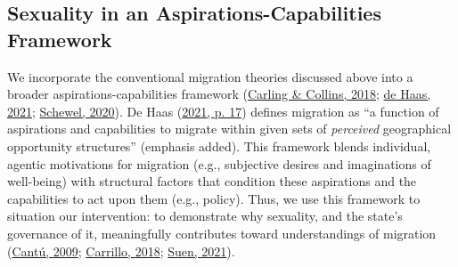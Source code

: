 \documentclass[
  12pt,
]{article}
\begin{document}
\hypertarget{sexuality-in-an-aspirations-capabilities-framework}{%
\subsection{Sexuality in an Aspirations-Capabilities Framework}\label{sexuality-in-an-aspirations-capabilities-framework}}

We incorporate the conventional migration theories discussed above into a broader aspirations-capabilities framework (\protect\hyperlink{ref-carling_2018_aspiration}{Carling \& Collins, 2018}; \protect\hyperlink{ref-dehaas_2021}{de Haas, 2021}; \protect\hyperlink{ref-schewel_2020}{Schewel, 2020}). De Haas (\protect\hyperlink{ref-dehaas_2021}{2021, p. 17}) defines migration as ``a function of aspirations and capabilities to migrate within given sets of \emph{perceived} geographical opportunity structures'' (emphasis added). This framework blends individual, agentic motivations for migration (e.g., subjective desires and imaginations of well-being) with structural factors that condition these aspirations and the capabilities to act upon them (e.g., policy). Thus, we use this framework to situation our intervention: to demonstrate why sexuality, and the state's governance of it, meaningfully contributes toward understandings of migration (\protect\hyperlink{ref-cantu_2009}{Cantú, 2009}; \protect\hyperlink{ref-carrillo_2018}{Carrillo, 2018}; \protect\hyperlink{ref-suen_2021_sexual}{Suen, 2021}).
\end{document}
